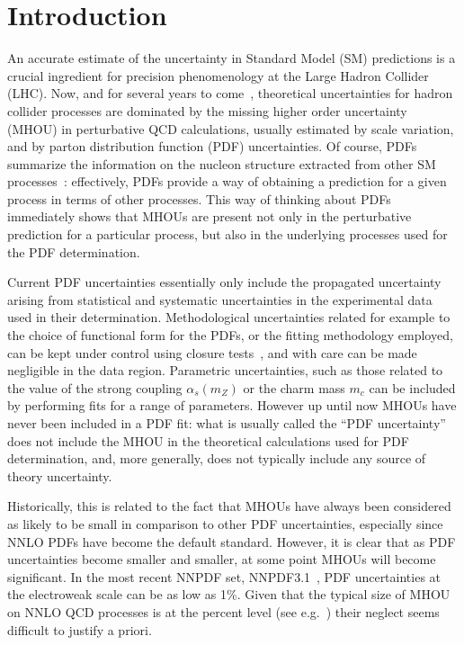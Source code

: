 \section{Introduction}
\label{sec:introduction}

An accurate estimate of the uncertainty in Standard Model (SM) predictions
is a crucial ingredient for precision phenomenology at the Large Hadron 
Collider (LHC).
%
Now, and for several years to come~\cite{Cepeda:2019klc,Azzi:2019yne},
theoretical 
uncertainties for hadron collider processes are
dominated by the missing higher order uncertainty (MHOU) in perturbative 
QCD calculations, usually estimated by scale 
variation, and by parton distribution function (PDF) uncertainties.
%
Of course, PDFs 
summarize the information on the nucleon structure extracted from other
SM processes~\cite{Gao:2017yyd}: effectively, PDFs provide a way of obtaining
a prediction for a given process in terms of other processes.
%
This way of thinking
about PDFs immediately shows that MHOUs are present 
not only in the perturbative prediction for a particular process, but 
also in the underlying processes used for the PDF determination.

Current PDF uncertainties essentially only
include the propagated uncertainty arising from statistical and
systematic uncertainties in the experimental data used in their 
determination.
%
Methodological uncertainties related for example to
the choice of functional form for the PDFs, or the fitting methodology employed, can be kept under control using closure tests~\cite{Ball:2014uwa}, and with care can be made negligible in the data region.
%
Parametric uncertainties, such as those related to the value of
the strong coupling $\alpha_s(m_Z)$ or the charm mass $m_c$ can be included by 
performing fits for a range of parameters.
%
However up until now MHOUs have never been included in a PDF fit: what is 
usually called the ``PDF uncertainty'' does not include 
the MHOU in the theoretical calculations used for PDF determination, and, 
more generally, does not typically include any source of theory 
uncertainty. 

Historically,
this is related to the fact that MHOUs
have always been
considered as likely to be small in comparison to other
PDF uncertainties, especially since NNLO PDFs have become the default
standard.
%
However, it is clear that as PDF uncertainties become
smaller and smaller, at some point MHOUs will become significant. 
In the most recent NNPDF set, NNPDF3.1~\cite{Ball:2017nwa}, PDF
uncertainties at the electroweak scale can be as low as 1\%.
%
Given that the
typical size of MHOU on NNLO QCD processes is at the percent level (see
e.g.~\cite{Campbell:2017hsr}) their neglect seems difficult to justify a priori.


